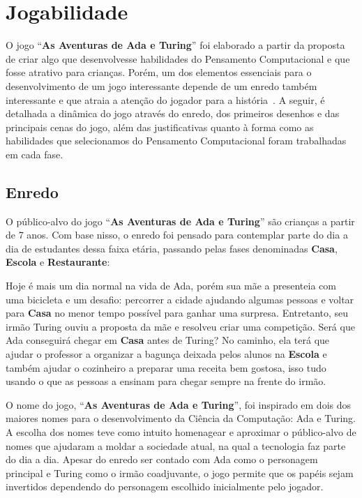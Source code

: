 \section{Jogabilidade} \label{sec:jogabilidade}

O jogo “\textbf{As Aventuras de Ada e Turing}” foi elaborado a partir da proposta de criar algo que desenvolvesse habilidades do Pensamento Computacional e que fosse atrativo para crianças. Porém, um dos elementos essenciais para o desenvolvimento de um jogo interessante depende de um enredo também interessante e que atraia a atenção do jogador para a história~\cite{arruda2014fundamentos}. A seguir, é detalhada a dinâmica do jogo através do enredo, dos primeiros desenhos e das principais cenas do jogo, além das justificativas quanto à forma como as habilidades que selecionamos do Pensamento Computacional foram trabalhadas em cada fase.

\subsection{Enredo} \label{ssec:enredo}

O público-alvo do jogo “\textbf{As Aventuras de Ada e Turing}” são crianças a partir de 7 anos. Com base nisso, o enredo foi pensado para contemplar parte do dia a dia de estudantes dessa faixa etária, passando pelas fases denominadas \textbf{Casa}, \textbf{Escola} e \textbf{Restaurante}:

Hoje é mais um dia normal na vida de Ada, porém sua mãe a presenteia com uma bicicleta e um desafio: percorrer a cidade ajudando algumas pessoas e voltar para \textbf{Casa} no menor tempo possível para ganhar uma surpresa. Entretanto, seu irmão Turing ouviu a proposta da mãe e resolveu criar uma competição. Será que Ada conseguirá chegar em \textbf{Casa} antes de Turing? No caminho, ela terá que ajudar o professor a organizar a bagunça deixada pelos alunos na \textbf{Escola} e também ajudar o cozinheiro a preparar uma receita bem gostosa, isso tudo usando o que as pessoas a ensinam para chegar sempre na frente do irmão.

O nome do jogo, “\textbf{As Aventuras de Ada e Turing}”, foi inspirado em dois dos maiores nomes para o desenvolvimento da Ciência da Computação: Ada e Turing. A escolha dos nomes teve como intuito homenagear e aproximar o público-alvo de nomes que ajudaram a moldar a sociedade atual, na qual a tecnologia faz parte do dia a dia. Apesar do enredo ser contado com Ada como o personagem principal e Turing como o irmão coadjuvante, o jogo permite que os papéis sejam invertidos dependendo do personagem escolhido inicialmente pelo jogador.

